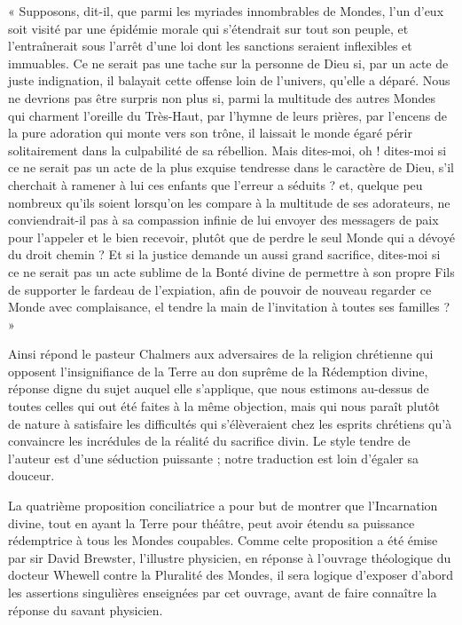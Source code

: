 \documentclass[a4paper, 11pt, oneside, landscape]{article}
\begin{document}
« Supposons, dit-il, que parmi les myriades innombrables de Mondes, l'un d'eux soit visité par une épidémie morale qui s'étendrait sur tout son peuple, et l'entraînerait sous l'arrêt d'une loi dont les sanctions seraient inflexibles et immuables. Ce ne serait pas une tache sur la personne de Dieu si, par un acte de juste indignation, il balayait cette offense loin de l'univers, qu'elle a déparé. Nous ne devrions pas être surpris non plus si, parmi la multitude des autres Mondes qui charment l'oreille du Très-Haut, par l'hymne de leurs prières, par l'encens de la pure adoration qui monte vers son trône, il laissait le monde égaré périr solitairement dans la culpabilité de sa rébellion. Mais dites-moi, oh ! dites-moi si ce ne serait pas un acte de la plus exquise tendresse dans le caractère de Dieu, s'il cherchait à ramener à lui ces enfants que l'erreur a séduits ? et, quelque peu nombreux qu'ils soient lorsqu'on les compare à la multitude de ses adorateurs, ne conviendrait-il pas à sa compassion infinie de lui envoyer des messagers de paix pour l'appeler et le bien recevoir, plutôt que de perdre le seul Monde qui a dévoyé du droit chemin ? Et si la justice demande un aussi grand sacrifice, dites-moi si ce ne serait pas un acte sublime de la Bonté divine de permettre à son propre Fils de supporter le fardeau de l'expiation, afin de pouvoir de nouveau regarder ce Monde avec complaisance, el tendre la main de l'invitation à toutes ses familles ? »

Ainsi répond le pasteur Chalmers aux adversaires de la religion chrétienne qui opposent l'insignifiance de la Terre au don suprême de la Rédemption divine, réponse digne du sujet auquel elle s'applique, que nous estimons au-dessus de toutes celles qui out été faites à la même objection, mais qui nous paraît plutôt de nature à satisfaire les difficultés qui s'élèveraient chez les esprits chrétiens qu'à convaincre les incrédules de la réalité du sacrifice divin. Le style tendre de l'auteur est d'une séduction puissante ; notre traduction est loin d'égaler sa douceur.

La quatrième proposition conciliatrice a pour but de montrer que l'Incarnation divine, tout en ayant la Terre pour théâtre, peut avoir étendu sa puissance rédemptrice à tous les Mondes coupables. Comme celte proposition a été émise par sir David Brewster, l'illustre physicien, en réponse à l'ouvrage théologique du docteur Whewell contre la Pluralité des Mondes, il sera logique d'exposer d'abord les assertions singulières enseignées par cet ouvrage, avant de faire connaître la réponse du savant physicien.
\end{document}
